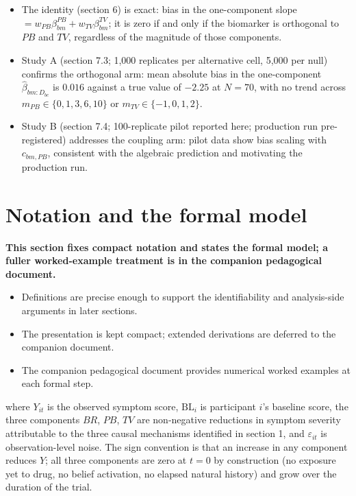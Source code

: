 \documentclass[
  11pt,
]{article}
\begin{document}
\begin{itemize}\setlength{\itemsep}{2pt}\setlength{\parskip}{0pt}
\item The identity (section 6) is exact: bias in the one-component slope $= w_{PB}\beta_{bm}^{PB} + w_{TV}\beta_{bm}^{TV}$; it is zero if and only if the biomarker is orthogonal to $PB$ and $TV$, regardless of the magnitude of those components.
\item Study A (section 7.3; 1,000 replicates per alternative cell, 5,000 per null) confirms the orthogonal arm: mean absolute bias in the one-component $\hat\beta_{bm:D_{bc}}$ is $0.016$ against a true value of $-2.25$ at $N=70$, with no trend across $m_{PB} \in \{0,1,3,6,10\}$ or $m_{TV} \in \{-1,0,1,2\}$.
\item Study B (section 7.4; 100-replicate pilot reported here; production run pre-registered) addresses the coupling arm: pilot data show bias scaling with $c_{bm,PB}$, consistent with the algebraic prediction and motivating the production run.
\end{itemize}

\section{Notation and the formal model}\label{notation-and-the-formal-model}

\textbf{This section fixes compact notation and states the formal model; a fuller worked-example treatment is in the companion pedagogical document.}

\begin{itemize}\setlength{\itemsep}{2pt}\setlength{\parskip}{0pt}
\item Definitions are precise enough to support the identifiability and analysis-side arguments in later sections.
\item The presentation is kept compact; extended derivations are deferred to the companion document.
\item The companion pedagogical document provides numerical worked examples at each formal step.
\end{itemize}

where \(Y_{it}\) is the observed symptom score, \(\mathrm{BL}_i\)
is participant \(i\)'s baseline score, the three components \(BR\),
\(PB\), \(TV\) are non-negative reductions in symptom severity
attributable to the three causal mechanisms identified in
section 1, and \(\varepsilon_{it}\) is observation-level noise.
The sign convention is that an increase in any component reduces
\(Y\); all three components are zero at \(t = 0\) by construction
(no exposure yet to drug, no belief activation, no elapsed
natural history) and grow over the duration of the trial.
\end{document}
